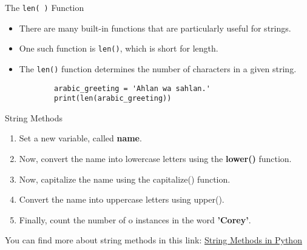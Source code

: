\documentclass[../main.tex]{subfiles}
\begin{document}
\begin{frame}[fragile]{The \texttt{len( )} Function}
  \begin{itemize}
  \item There are many built-in functions that are particularly useful for strings. 
  \item One such function is \texttt{len()}, which is short for length. 
  \item The \texttt{len()} function determines the number of characters in a given string.

    \begin{code}{}
      \begin{lstlisting}
        arabic_greeting = 'Ahlan wa sahlan.'
        print(len(arabic_greeting))
      \end{lstlisting}
    \end{code}
  \end{itemize}
\end{frame}

\begin{frame}{String Methods}

  \begin{exercise}{}
    \begin{enumerate}
    \item Set a new variable, called \textbf{name}.
    \item Now, convert the name into lowercase letters using the \textbf{lower()} function.
    \item Now, capitalize the name using the capitalize() function.
    \item Convert the name into uppercase letters using upper().
    \item Finally, count the number of o instances in the word \textbf{'Corey'}.
    \end{enumerate}
  \end{exercise}

  You can find more about string methods in this link: \href{https://www.w3schools.com/python/python_ref_string.asp}{String Methods in Python}

\end{frame}
\end{document}
